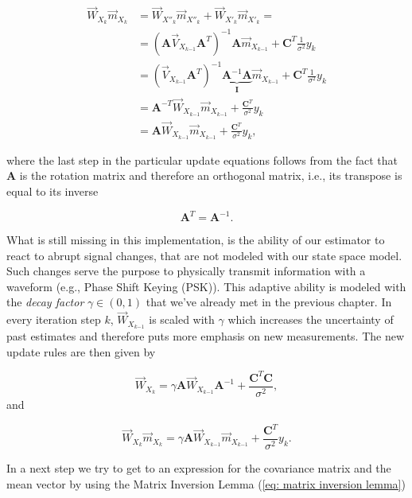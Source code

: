 \documentclass[11pt,a4paper,twoside]{report}
\newcommand{\messF}[3]{\overrightarrow{#1}_{{#2}_{k{#3}}}}
\newcommand{\mat}[1]{\mathbf{#1}}
\begin{document}
\begin{align}
  \label{eq: weighted mean}
  \messF{W}{X}{}\messF{m}{X}{} &= \messF{W}{X''}{}\messF{m}{X''}{} + \messF{W}{X'}{}\messF{m}{X'}{} = \\
  &= \left(\mat{A}\messF{V}{X}{-1}\mat{A}^T\right)^{-1}\mat{A}\messF{m}{X}{-1} + \mat{C}^T\frac{1}{\sigma^2}y_k \\
  &= \left(\messF{V}{X}{-1}\mat{A}^T\right)^{-1}\underbrace{\mat{A}^{-1}\mat{A}}_{\mat{I}}\messF{m}{X}{-1} + \mat{C}^T\frac{1}{\sigma^2}y_k \\
  &= \mat{A}^{-T}\messF{W}{X}{-1}\messF{m}{X}{-1} + \frac{\mat{C}^T}{\sigma^2}y_k \\
  &= \mat{A}\messF{W}{X}{-1}\messF{m}{X}{-1} + \frac{\mat{C}^T}{\sigma^2}y_k,
\end{align}

where the last step in the particular update equations follows from the fact that $\mat{A}$ is the rotation matrix and therefore an orthogonal matrix, i.e., its transpose is equal to its inverse

\begin{equation*}
	\mat{A}^T = \mat{A}^{-1}.
\end{equation*}

What is still missing in this implementation, is the ability of our estimator to react to abrupt signal changes, that are not modeled with our state space model. Such changes serve the purpose to physically transmit information with a waveform (e.g., Phase Shift Keying (PSK)). This adaptive ability is modeled with the \emph{decay factor} $\gamma \in (0,1)$ that we've already met in the previous chapter. In every iteration step $k$, $\messF{W}{X}{-1}$ is scaled with $\gamma$ which increases the uncertainty of  past estimates and therefore puts more emphasis on new measurements. The new update rules are then given by


\begin{equation}
  \label{eq: decay precision matrix}
  \messF{W}{X}{} = \gamma \mat{A}\messF{W}{X}{-1}\mat{A}^{-1} + \frac{\mat{C}^T\mat{C}}{\sigma^2},
\end{equation} 
and

\begin{equation}
  \label{eq: decay weighted mean}
  \messF{W}{X}{}\messF{m}{X}{} = \gamma \mat{A}\messF{W}{X}{-1}\messF{m}{X}{-1} + \frac{\mat{C}^T}{\sigma^2}y_k.
\end{equation}


In a next step we try to get to an expression for the covariance matrix and the mean vector by using the Matrix Inversion Lemma (\ref{eq: matrix inversion lemma})
 
\end{document}
